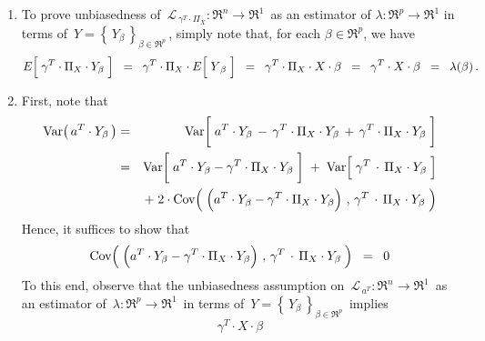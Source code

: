\begin{enumerate}
\item
	To prove unbiasedness of
	\,$\mathcal{L}_{\,\gamma^{T} \cdot \Pi_{X}} : \Re^{n} \longrightarrow \Re^{1}$\,
	as an estimator of $\lambda : \Re^{p} \longrightarrow \Re^{1}$
	in terms of \,$Y = \left\{\,Y_{\beta}\,\right\}_{\beta\in\Re^{p}}$\,,
	simply note that, for each $\beta \in \Re^{p}$, we have
	\begin{equation*}
	E\!\left[\;\gamma^{T} \cdot \overset{{\color{white}.}}{\Pi}_{X} \cdot Y_{\beta}\;\right]
	\;\; = \;\;
		\gamma^{T} \cdot \Pi_{X} \cdot E\!\left[\;\overset{{\color{white}.}}{Y}_{\beta}\;\right]
	\;\; = \;\;
		\gamma^{T} \cdot \Pi_{X} \cdot X \cdot \beta
	\;\; = \;\;
		\gamma^{T} \cdot X \cdot \beta
	\;\; = \;\;
		\lambda(\beta)\,.
	\end{equation*}
\item
	First, note that
	\begin{eqnarray*}
	\Var\!\left(\,a^{T} \cdot Y_{\beta}\,\right)
	&=&
		\Var\!\left[\;
			a^{T} \cdot Y_{\beta}
			\,\overset{{\color{white}+}}{-}\,
			\gamma^{T} \cdot \Pi_{X} \cdot Y_{\beta}
			\,+\,
			\gamma^{T} \cdot \Pi_{X} \cdot Y_{\beta}
			\;\right]
	\\
	&=&
		\Var\!\left[\;
			a^{T} \cdot Y_{\beta}
			\overset{{\color{white}+}}{-}
			\gamma^{T} \cdot \Pi_{X} \cdot Y_{\beta}
				\;\right]
		\; + \;
		\Var\!\left[\;
			\gamma^{T} \overset{{\color{white}+}}{\cdot} \Pi_{X} \cdot Y_{\beta}
			\;\right]
	\\
	&&	+ \;
		2\cdot\Cov\!\left(\;
			\left(a^{T} \cdot Y_{\beta}
			\overset{{\color{white}.}}{-}
			\gamma^{T} \cdot \Pi_{X} \cdot Y_{\beta}\right)
			\,,\,
			\gamma^{T} \overset{{\color{white}+}}{\cdot} \Pi_{X} \cdot Y_{\beta}
			\;\right)
	\end{eqnarray*}
	Hence, it suffices to show that
	\begin{equation*}
		\Cov\!\left(\;
			\left(a^{T} \cdot Y_{\beta}
			\overset{{\color{white}.}}{-}
			\gamma^{T} \cdot \Pi_{X} \cdot Y_{\beta}\right)
			\,,\,
			\gamma^{T} \overset{{\color{white}+}}{\cdot} \Pi_{X} \cdot Y_{\beta}
			\;\right)
		\;\; = \;\; 0
	\end{equation*}
	To this end, observe that the unbiasedness assumption on
	\,$\mathcal{L}_{\,a^{T}} : \Re^{n} \longrightarrow \Re^{1}$\,
	as an estimator of
	\,$\lambda : \Re^{p} \longrightarrow \Re^{1}$\,
	in terms of \,$Y = \left\{\,Y_{\beta}\,\right\}_{\beta\in\Re^{p}}$\,
	implies
	\begin{equation*}
	\gamma^{T} \cdot X \cdot \beta

\end{equation*}
\end{enumerate}
